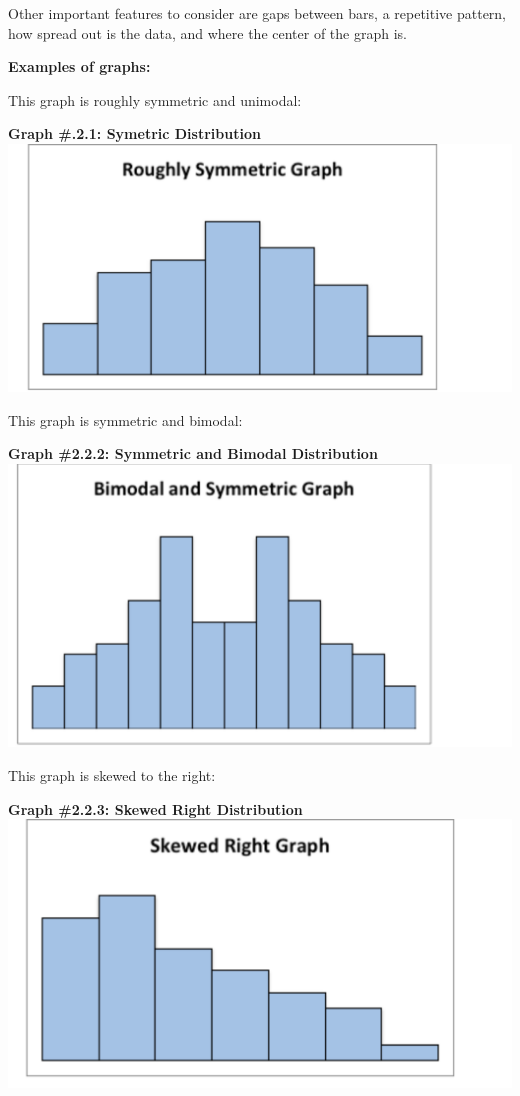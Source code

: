 \documentclass[
]{book}
\begin{document}
Other important features to consider are gaps between bars, a repetitive pattern, how spread out is the data, and where the center of the graph is.

\textbf{Examples of graphs:}

This graph is roughly symmetric and unimodal:

\textbf{Graph \#.2.1: Symetric Distribution}
\includegraphics{symmetric.png}

This graph is symmetric and bimodal:

\textbf{Graph \#2.2.2: Symmetric and Bimodal Distribution}
\includegraphics{bimodal_symmetric.png}

This graph is skewed to the right:

\textbf{Graph \#2.2.3: Skewed Right Distribution}
\includegraphics{skewed_right.png}
\end{document}
